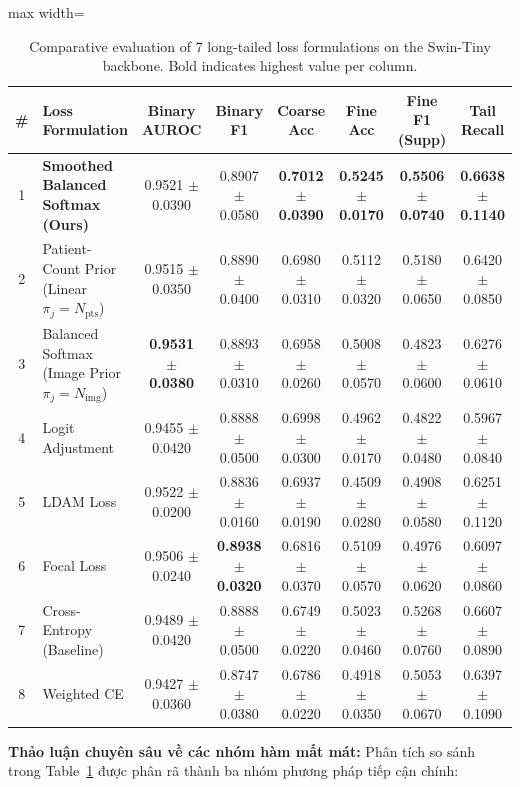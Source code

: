 \documentclass[runningheads]{llncs}
\begin{document}
\begin{table}[t]
\centering
\caption{Comparative evaluation of 7 long-tailed loss formulations on the Swin-Tiny backbone. Bold indicates highest value per column.}
\label{tab:stage20_loss}
\begin{adjustbox}{max width=\textwidth}
\begin{tabular}{clcccccc}
\toprule
\textbf{\#} & \textbf{Loss Formulation} & \textbf{Binary AUROC} & \textbf{Binary F1} & \textbf{Coarse Acc} & \textbf{Fine Acc} & \textbf{Fine F1 (Supp)} & \textbf{Tail Recall} \\
\midrule
1 & \textbf{Smoothed Balanced Softmax (Ours)} & 0.9521 $\pm$ 0.0390 & 0.8907 $\pm$ 0.0580 & \textbf{0.7012 $\pm$ 0.0390} & \textbf{0.5245 $\pm$ 0.0170} & \textbf{0.5506 $\pm$ 0.0740} & \textbf{0.6638 $\pm$ 0.1140} \\
2 & Patient-Count Prior (Linear $\pi_j = N_{\text{pts}}$) & 0.9515 $\pm$ 0.0350 & 0.8890 $\pm$ 0.0400 & 0.6980 $\pm$ 0.0310 & 0.5112 $\pm$ 0.0320 & 0.5180 $\pm$ 0.0650 & 0.6420 $\pm$ 0.0850 \\
3 & Balanced Softmax (Image Prior $\pi_j = N_{\text{img}}$) & \textbf{0.9531 $\pm$ 0.0380} & 0.8893 $\pm$ 0.0310 & 0.6958 $\pm$ 0.0260 & 0.5008 $\pm$ 0.0570 & 0.4823 $\pm$ 0.0600 & 0.6276 $\pm$ 0.0610 \\
4 & Logit Adjustment & 0.9455 $\pm$ 0.0420 & 0.8888 $\pm$ 0.0500 & 0.6998 $\pm$ 0.0300 & 0.4962 $\pm$ 0.0170 & 0.4822 $\pm$ 0.0480 & 0.5967 $\pm$ 0.0840 \\
5 & LDAM Loss & 0.9522 $\pm$ 0.0200 & 0.8836 $\pm$ 0.0160 & 0.6937 $\pm$ 0.0190 & 0.4509 $\pm$ 0.0280 & 0.4908 $\pm$ 0.0580 & 0.6251 $\pm$ 0.1120 \\
6 & Focal Loss & 0.9506 $\pm$ 0.0240 & \textbf{0.8938 $\pm$ 0.0320} & 0.6816 $\pm$ 0.0370 & 0.5109 $\pm$ 0.0570 & 0.4976 $\pm$ 0.0620 & 0.6097 $\pm$ 0.0860 \\
7 & Cross-Entropy (Baseline) & 0.9489 $\pm$ 0.0420 & 0.8888 $\pm$ 0.0500 & 0.6749 $\pm$ 0.0220 & 0.5023 $\pm$ 0.0460 & 0.5268 $\pm$ 0.0760 & 0.6607 $\pm$ 0.0890 \\
8 & Weighted CE & 0.9427 $\pm$ 0.0360 & 0.8747 $\pm$ 0.0380 & 0.6786 $\pm$ 0.0220 & 0.4918 $\pm$ 0.0350 & 0.5053 $\pm$ 0.0670 & 0.6397 $\pm$ 0.1090 \\
\bottomrule
\end{tabular}
\end{adjustbox}
\end{table}

\noindent \textbf{Thảo luận chuyên sâu về các nhóm hàm mất mát:} Phân tích so sánh trong Table~\ref{tab:stage20_loss} được phân rã thành ba nhóm phương pháp tiếp cận chính:
\end{document}
